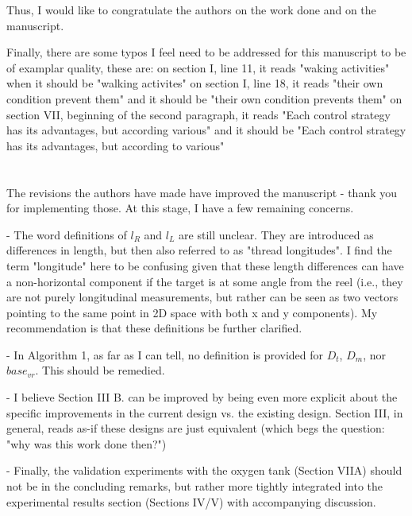\documentclass[journal,onecolumn,12pt]{IEEEtran}
\begin{document}
Thus, I would like to congratulate the authors on the work done and on the manuscript.

Finally, there are some typos I feel need to be addressed for this manuscript to be of examplar quality, these are:
on section I, line 11, it reads "waking activities" when it should be "walking activites"
on section I, line 18, it reads "their own condition prevent them" and it should be "their own condition prevents them"
on section VII, beginning of the second paragraph, it reads "Each control strategy has its advantages, but according various" and it should be "Each control strategy has its advantages, but according to various"


\section*{}

The revisions the authors have made have improved the manuscript - thank you for implementing those. At this stage, I have a few remaining concerns.

- The word definitions of $l_R$ and $l_L$ are still unclear. They are introduced as differences in length, but then also referred to as "thread longitudes". I find the term "longitude" here to be confusing given that these length differences can have a non-horizontal component if the target is at some angle from the reel (i.e., they are not purely longitudinal measurements, but rather can be seen as two vectors pointing to the same point in 2D space with both x and y components). My recommendation is that these definitions be further clarified.

- In Algorithm 1, as far as I can tell, no definition is provided for $D_t$, $D_m$, nor $base_{vr}$. This should be remedied.

- I believe Section III B. can be improved by being even more explicit about the specific improvements in the current design vs. the existing design. Section III, in general, reads as-if these designs are just equivalent (which begs the question: "why was this work done then?")

- Finally, the validation experiments with the oxygen tank (Section VIIA) should not be in the concluding remarks, but rather more tightly integrated into the experimental results section (Sections IV/V) with accompanying discussion.


\section*{}
\end{document}
